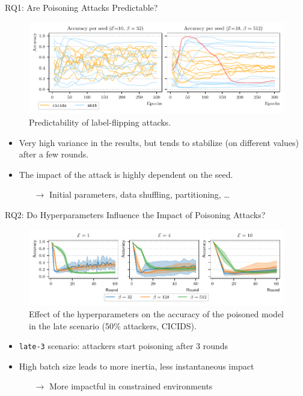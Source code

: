 \begin{frame}{RQ1: Are Poisoning Attacks Predictable?}

  \begin{figure}
    \centering
    \includegraphics[width=.8\textwidth]{figures/assessment/accuracy_per_seed.pdf}
    \caption{Predictability of label-flipping attacks.}
  \end{figure}

  \begin{itemize}
    \item Very high variance in the results, but tends to stabilize (on different values) after a few rounds.

    \item The impact of the attack is highly dependent on the seed.
    \begin{itemize}
      \item[$\rightarrow$] Initial parameters, data shuffling, partitioning, \dots
    \end{itemize}
  \end{itemize}


\end{frame}

\begin{frame}{RQ2: Do Hyperparameters Influence the Impact of Poisoning Attacks?}

  \begin{figure}
    \centering
    \includegraphics[width=\textwidth]{figures/assessment/hyperparams-late-icdcs.pdf}
    \caption{Effect of the hyperparameters on the accuracy of the poisoned
    model in the late scenario (50\% attackers, CICIDS).}
  \end{figure}

  \begin{itemize}
    \item \texttt{late-3} scenario: attackers start poisoning after 3 rounds
    \item High batch size leads to more inertia, less instantaneous impact
    \begin{itemize}
      \item[$\rightarrow$] More impactful in constrained environments
    \end{itemize}
  \end{itemize}

\end{frame}


